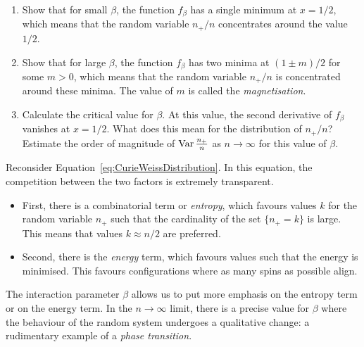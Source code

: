 \begin{exercise}
    \begin{enumerate}
        \item Show that for small $\beta$, the function \( f_{\beta} \) has a single minimum at $x=1/2$, which means that the random variable \( n_+/n \) concentrates around the value \( 1/2 \).
        \item Show that for large $\beta$, the function \( f_{\beta} \) has two minima at \( (1 \pm m)/2 \) for some $m>0$, which means that the random variable \( n_+/n \) is concentrated around these minima.
        The value of $m$ is called the \emph{magnetisation}.
        \item Calculate the critical value for $\beta$. At this value, the second derivative of \( f_{\beta} \) vanishes at \( x=1/2 \). What does this mean for the distribution of \( n_+/n \)?
        Estimate the order of magnitude of $\operatorname{Var}\frac{n_+}{n}$ as $n\to\infty$ for this value of $\beta$.
    \end{enumerate}
\end{exercise}

\begin{remark}
    Reconsider Equation~\eqref{eq:CurieWeissDistribution}.
    In this equation, the competition between the two factors is extremely transparent.
    \begin{itemize}
        \item     First, there is a combinatorial term or \emph{entropy}, which favours values $k$ for the random variable
        $n_+$ such that the cardinality of the set $\{n_+=k\}$ is large.
        This means that values $k\approx n/2$ are preferred.
        \item     Second, there is the \emph{energy} term, which favours values such that the energy 
        is minimised. This favours configurations where as many spins as possible align.    
    \end{itemize}
    The interaction parameter $\beta$ allows us to put more emphasis
    on the entropy term or on the energy term.
    In the $n\to\infty$ limit, there is a precise value for $\beta$
    where the behaviour of the random system undergoes a qualitative change:
    a rudimentary example of a \emph{phase transition}.
\end{remark}
